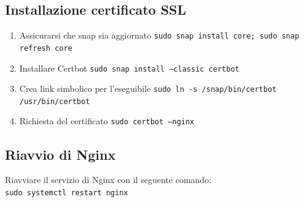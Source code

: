 \subsection{Installazione certificato SSL}
\begin{enumerate}
\item Assicurarsi che snap sia aggiornato \texttt{sudo snap install core; sudo snap refresh core}
\item Installare Certbot \texttt{sudo snap install --classic certbot}
\item Crea link simbolico per l'eseguibile \texttt{sudo ln -s /snap/bin/certbot /usr/bin/certbot}
\item Richiesta del certificato \texttt{sudo certbot --nginx}
\end{enumerate}

\subsection*{Riavvio di Nginx}
Riavviare il servizio di Nginx con il seguente comando: \\
\texttt{sudo systemctl restart nginx}

